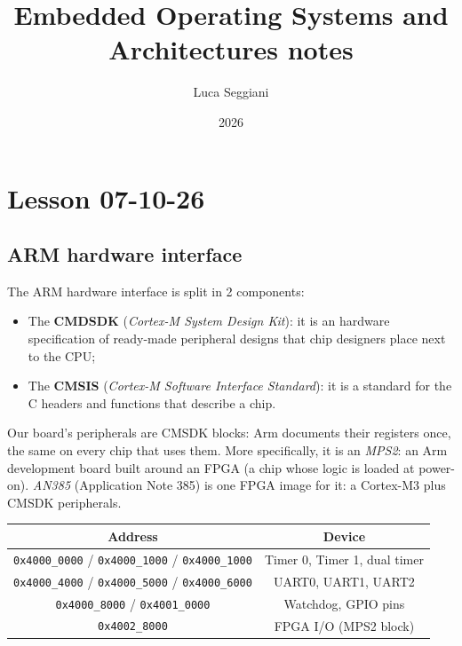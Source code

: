 \documentclass[a4paper,11pt]{article}
\title{Embedded Operating Systems and Architectures notes}
\author{Luca Seggiani}
\date{2026}
\begin{document}
\section{Lesson 07-10-26}

\thispagestyle{empty}
\pagestyle{fancy}

\subsection{ARM hardware interface}

The ARM hardware interface is split in 2 components:
\begin{itemize}
	\item The \textbf{CMDSDK} (\textit{Cortex-M System Design Kit}): it is an hardware specification of ready-made peripheral designs that chip designers place next to the CPU;
	\item The \textbf{CMSIS} (\textit{Cortex-M Software Interface Standard}): it is a standard for the C headers and functions that describe a chip.
\end{itemize}

Our board's peripherals are CMSDK blocks: Arm documents their registers once, the same on every chip that
uses them.
More specifically, it is an \textit{MPS2}: an Arm development board built around an FPGA (a chip whose logic is loaded at power-on). \textit{AN385}
(Application Note 385) is one FPGA image for it: a Cortex-M3 plus CMSDK peripherals.

\begin{table}[h!]
	\center {}
	\begin{tabular} { c | c }
		\bfseries Address                                                     & \bfseries Device             \\
		\hline
		\texttt{0x4000\_0000} / \texttt{0x4000\_1000} / \texttt{0x4000\_1000} & Timer 0, Timer 1, dual timer \\

		\texttt{0x4000\_4000} / \texttt{0x4000\_5000} / \texttt{0x4000\_6000} & UART0, UART1, UART2          \\
		\texttt{0x4000\_8000} / \texttt{0x4001\_0000}                         & Watchdog, GPIO pins          \\
		\texttt{0x4002\_8000}                                                 & FPGA I/O (MPS2 block)
	\end{tabular}
\end{table}
\end{document}
